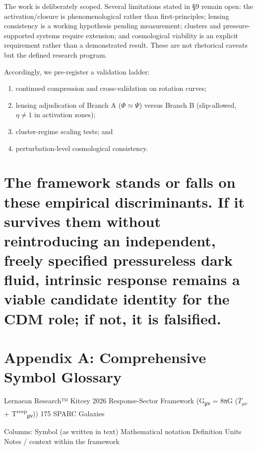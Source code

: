 The work is deliberately scoped. Several limitations stated in §9 remain open: the activation/closure is phenomenological rather than first-principles; lensing consistency is a working hypothesis pending measurement; clusters and pressure-supported systems require extension; and cosmological viability is an explicit requirement rather than a demonstrated result. These are not rhetorical caveats but the defined research program.

Accordingly, we pre-register a validation ladder:

\begin{enumerate}
\def\labelenumi{(\roman{enumi})}
\item
  continued compression and cross-validation on rotation curves;
\item
  lensing adjudication of Branch A (\(\Phi \simeq \Psi\)) versus Branch B (slip-allowed, \(\eta \neq 1\) in activation zones);
\item
  cluster-regime scaling tests; and
\item
  perturbation-level cosmological consistency.
\end{enumerate}

\section{The framework stands or falls on these empirical discriminants. If it survives them without reintroducing an independent, freely specified pressureless dark fluid, intrinsic response remains a viable candidate identity for the CDM role; if not, it is falsified.}\label{the-framework-stands-or-falls-on-these-empirical-discriminants.-if-it-survives-them-without-reintroducing-an-independent-freely-specified-pressureless-dark-fluid-intrinsic-response-remains-a-viable-candidate-identity-for-the-cdm-role-if-not-it-is-falsified.}

\section{Appendix A: Comprehensive Symbol Glossary}\label{appendix-a-comprehensive-symbol-glossary}

Lernaean Research™ \textbar{} Kitcey 2026 \textbar{} Response-Sector Framework (G\textsubscript{μν} = 8πG ($\overline{T}_{\mu\nu}$ + T\textsuperscript{resp}\textsubscript{μν})) \textbar{} 175 SPARC Galaxies

Columns: Symbol (as written in text) \textbar{} Mathematical notation \textbar{} Definition \textbar{} Units \textbar{} Notes / context within the framework


